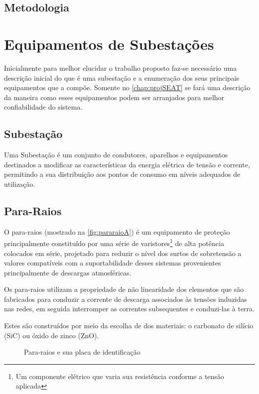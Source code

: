 	\section{Metodologia}
	\textcolor{red}{\lipsum[1-2]}



\chapter{Equipamentos de Subestações}
	\label{chap:equipSE}
	Inicialmente para melhor elucidar o trabalho proposto faz-se necessário uma descrição inicial do que é uma subestação e a enumeração dos seus principais equipamentos que a compõe. Somente no \autoref{chap:projSEAT} se fará uma descrição da maneira como esses equipamentos podem ser arranjados para melhor confiabilidade do sistema.
	\section*{Subestação}
	Uma Subestação é um conjunto de condutores, aparelhos e equipamentos destinados a modificar as características da energia elétrica de tensão e corrente, permitindo a sua distribuição aos pontos de consumo em níveis adequados de utilização.\cite{instElet}

	\section{Para-Raios}
		O para-raios (mostrado na \autoref{fig:pararaioA}) é um equipamento de proteção principalmente constituído por uma série de varistores\footnote{Um componente elétrico que varia sua resistência conforme a tensão aplicada\cite[p. 413]{BellSytemHistory}} de alta potência colocados em série, projetado para reduzir o nível dos surtos de sobretensão a valores compatíveis com a suportabilidade desses sistemas provenientes principalmente de descargas atmosféricas.\par
		Os para-raios utilizam a propriedade de não linearidade dos elementos que são fabricados para conduzir a corrente de descarga associados às tensões induzidas nas redes, em seguida interromper as correntes subsequentes e conduzi-las à terra.\par
		Estes são construídos por meio da escolha de dos materiais: o carbonato de silício (SiC) ou óxido de zinco (ZnO). 

		\begin{figure}[htb]
			\caption{Para-raios e sua placa de identificação}
			\centering
		\end{figure}

